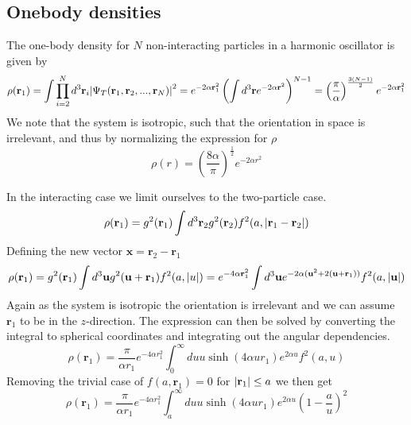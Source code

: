 \documentclass[a4paper, 10pt, english]{revtex4-2} %
\begin{document}
    \subsection*{Onebody densities}
        The one-body density for $N$ non-interacting particles in a harmonic oscillator is given by 
        \begin{equation}
                \rho(\mathbf{r}_1)
            =   \int \prod_{i=2}^{N} d^3\mathbf{r}_i \abs{\Psi_T(\mathbf{r}_1, \mathbf{r}_2, ..., \mathbf{r}_N)}^2
            =   e^{-2\alpha\mathbf{r}_1^2} \left(\int d^3\mathbf{r} e^{-2\alpha\mathbf{r}^2}\right)^{N-1}
            =   \left(\frac{\pi}{\alpha}\right)^\frac{3(N-1)}{2} e^{-2\alpha \mathbf{r}_1^2}
        \end{equation}
        We note that the system is isotropic, such that the orientation in space is irrelevant, and thus by normalizing the expression for $\rho$
        \begin{equation}
                \rho(r)
            =   \left(\frac{8\alpha}{\pi}\right)^\frac{1}{2} e^{-2 \alpha r^2}
        \end{equation}

        In the interacting case we limit ourselves to the two-particle case.
        \begin{equation}
                \rho(\mathbf{r}_1)
            =   g^2(\mathbf{r}_1) \int d^3\mathbf{r}_2 g^2(\mathbf{r}_2) f^2(a, \abs{\mathbf{r}_1 - \mathbf{r}_2})
        \end{equation}
        Defining the new vector $\mathbf{x} = \mathbf{r}_2 - \mathbf{r}_1$
        \begin{equation}
                \rho(\mathbf{r}_1)
            =   g^2(\mathbf{r}_1) \int d^3 \mathbf{u}g^2(\mathbf{u} + \mathbf{r}_1) f^2(a, \abs{u})
            =   e^{-4 \alpha \mathbf{r}_1^2} \int d^3\mathbf{u} e^{-2 \alpha (\mathbf{u}^2 + 2(\mathbf{u} + \mathbf{r}_1))} f^2(a, \abs{\mathbf{u}})
        \end{equation}
        Again as the system is isotropic the orientation is irrelevant and we can assume $\mathbf{r}_1$ to be in the $z$-direction.
        The expression can then be solved by converting the integral to spherical coordinates and integrating out the angular dependencies.
        \begin{equation}
                \rho(\mathbf{r}_1)
            =   \frac{\pi}{\alpha r_1}e^{-4 \alpha r_1^2} \int_{0}^{\infty} du u\sinh(4 \alpha u r_1) e^{2 \alpha u} f^2(a, u)
        \end{equation}
        Removing the trivial case of $f(a, \mathbf{r}_1) = 0$ for $\abs{\mathbf{r}_1} \leq a$ we then get
        \begin{equation}
                \rho(\mathbf{r}_1)
            =   \frac{\pi}{\alpha r_1}e^{-4 \alpha r_1^2} \int_{a}^{\infty} du u\sinh(4 \alpha u r_1) e^{2 \alpha u} \left(1 - \frac{a}{u}\right)^2
        \end{equation}
\end{document}

